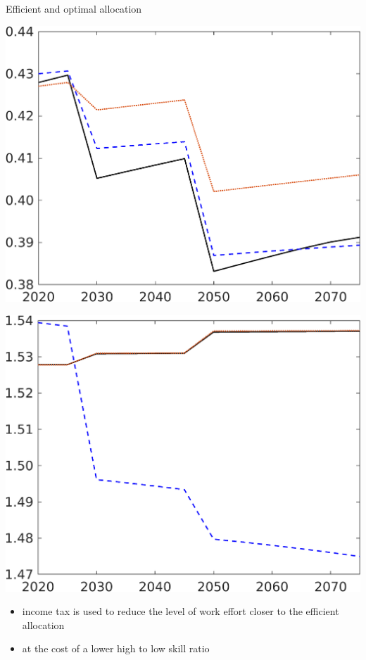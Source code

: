 \documentclass[11pt,aspectratio=169]{beamer}
\begin{document}
\begin{frame}{Efficient and optimal allocation }
\begin{minipage}[]{0.23\textwidth}
	\end{minipage}
\begin{minipage}[]{0.23\textwidth}
	\includegraphics[width=1\textwidth]{../codding_model/own_basedOnFried/optimalPol_elastS_DisuSci/figures/all_1705/hl_CompEffOPT_T_NoTaus_spillover0_sep1_BN1_ineq0_red0_etaa0.79_lgd0.png}
\end{minipage}
\begin{minipage}[]{0.23\textwidth}
	\includegraphics[width=1\textwidth]{../codding_model/own_basedOnFried/optimalPol_elastS_DisuSci/figures/all_1705/hhhl_CompEffOPT_T_NoTaus_spillover0_sep1_BN1_ineq0_red0_etaa0.79_lgd0.png}
\end{minipage}
\begin{itemize}
	\item income tax is used to reduce the level of work effort closer to the efficient allocation
	\item at the cost of a lower high to low skill ratio
\end{itemize}
\end{frame}
\end{document}
